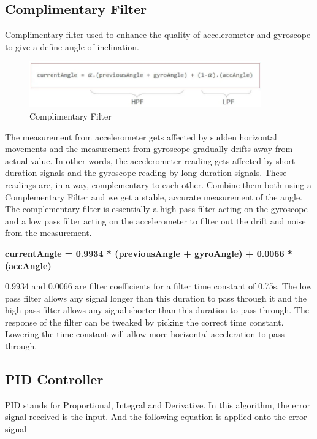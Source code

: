 \documentclass{article}
\begin{document}
 	\subsection{Complimentary Filter}
 	Complimentary filter used to enhance the quality of accelerometer and gyroscope to give a define angle of inclination.
 	
 	\begin{figure}[h]
 		\centering
 		\includegraphics[width=100mm,scale=0.5]{complimentaryfilter}
 		\caption{Complimentary Filter}
 		\label{Fig.5: Complimentary Filter}
 	\end{figure}
 	
 	The measurement from accelerometer gets affected by sudden horizontal movements and the measurement from gyroscope gradually drifts away from actual value. In other words, the accelerometer reading gets affected by short duration signals and the gyroscope reading by long duration signals. These readings are, in a way, complementary to each other. Combine them both using a Complementary Filter and we get a stable, accurate measurement of the angle. The complementary filter is essentially a high pass filter acting on the gyroscope and a low pass filter acting on the accelerometer to filter out the drift and noise from the measurement.
 	
 	\textbf{currentAngle = 0.9934 * (previousAngle + gyroAngle) + 0.0066 * (accAngle)}
 	
 	0.9934 and 0.0066 are filter coefficients for a filter time constant of 0.75s. The low pass filter allows any signal longer than this duration to pass through it and the high pass filter allows any signal shorter than this duration to pass through. The response of the filter can be tweaked by picking the correct time constant. Lowering the time constant will allow more horizontal acceleration to pass through.
 	
 	\subsection{PID Controller}
 	
 	PID stands for Proportional, Integral and Derivative. In this algorithm, the error signal received is the input. And the following equation is applied onto the error signal
 	
\end{document}
